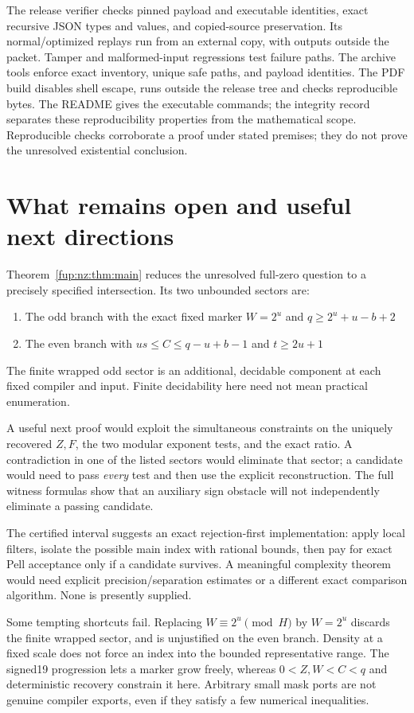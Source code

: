 \documentclass[11pt,letterpaper]{article}
\theoremstyle{definition}\newtheorem{definition}[theorem]{Definition}
\theoremstyle{remark}\newtheorem{remark}[theorem]{Remark}
\begin{document}
The release verifier checks pinned payload and executable identities, exact recursive JSON types and values, and copied-source preservation. Its normal/optimized replays run from an external copy, with outputs outside the packet. Tamper and malformed-input regressions test failure paths. The archive tools enforce exact inventory, unique safe paths, and payload identities. The PDF build disables shell escape, runs outside the release tree and checks reproducible bytes. The README gives the executable commands; the integrity record separates these reproducibility properties from the mathematical scope. Reproducible checks corroborate a proof under stated premises; they do not prove the unresolved existential conclusion.

\section{What remains open and useful next directions}\label{fup:nz:sec:future}
Theorem~\ref{fup:nz:thm:main} reduces the unresolved full-zero question to a precisely specified intersection. Its two unbounded sectors are:
\begin{enumerate}
\item The odd branch with the exact fixed marker $W=2^u$ and $q\ge2^u+u-b+2$
\item The even branch with $us\le C\le q-u+b-1$ and $t\ge2u+1$
\end{enumerate}
The finite wrapped odd sector is an additional, decidable component at each fixed compiler and input. Finite decidability here need not mean practical enumeration.

A useful next proof would exploit the simultaneous constraints on the uniquely recovered $Z,F$, the two modular exponent tests, and the exact ratio. A contradiction in one of the listed sectors would eliminate that sector; a candidate would need to pass \emph{every} test and then use the explicit reconstruction. The full witness formulas show that an auxiliary sign obstacle will not independently eliminate a passing candidate.

The certified interval suggests an exact rejection-first implementation: apply local filters, isolate the possible main index with rational bounds, then pay for exact Pell acceptance only if a candidate survives. A meaningful complexity theorem would need explicit precision/separation estimates or a different exact comparison algorithm. None is presently supplied.

Some tempting shortcuts fail. Replacing $W\equiv2^u\pmod H$ by $W=2^u$ discards the finite wrapped sector, and is unjustified on the even branch. Density at a fixed scale does not force an index into the bounded representative range. The signed19 progression lets a marker grow freely, whereas $0<Z,W<C<q$ and deterministic recovery constrain it here. Arbitrary small mask ports are not genuine compiler exports, even if they satisfy a few numerical inequalities.
\end{document}
